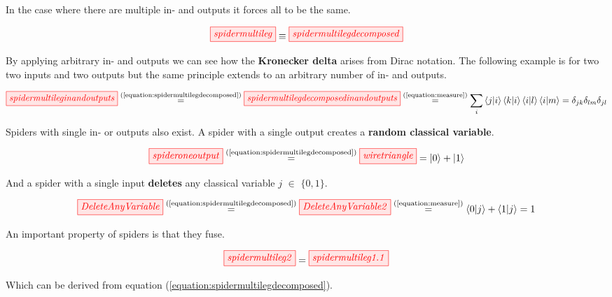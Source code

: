 \documentclass[]{article}
\newcommand{\equaltext}[1]{\ensuremath{\stackrel{\text{#1}}{=}}}
\begin{document}
In the case where there are multiple in- and outputs it forces all to be the same.

\begin{equation}
\label{equation:spidermultilegdecomposed}
\tikzfig{spidermultileg} \equiv \tikzfig{spidermultilegdecomposed}
\end{equation}

By applying arbitrary in- and outputs we can see how the \textbf{Kronecker delta} arises from Dirac notation. The following example is for two two inputs and two outputs but the same principle extends to an arbitrary number of in- and outputs.

\begin{equation}
\begin{split}
\tikzfig{spidermultileginandoutputs} \equaltext{(\ref{equation:spidermultilegdecomposed})} \tikzfig{spidermultilegdecomposedinandoutputs} \equaltext{(\ref{equation:measure})} \sum_{i} \bra{j}\ket{i}\bra{k}\ket{i}\bra{i}\ket{l}\bra{i}\ket{m} = \delta_{jk} \delta_{lm}  \delta_{jl}
\end{split}
\end{equation}

Spiders with single in- or outputs also exist. A spider with a single output creates a 
\textbf{random classical variable}.

\begin{equation}
\label{equation:spideroneoutput}
\tikzfig{spideroneoutput} \equaltext{(\ref{equation:spidermultilegdecomposed})} \tikzfig{wiretriangle} = \ket{0} + \ket{1}
\end{equation}

And a spider with a single input \textbf{deletes} any classical variable $j$ $\in$ $\{0,1\}$.

\begin{equation}
 \tikzfig{DeleteAnyVariable} \equaltext{(\ref{equation:spidermultilegdecomposed})} \tikzfig{DeleteAnyVariable2} \equaltext{(\ref{equation:measure})}  \bra{0}\ket{j} + \bra{1}\ket{j} = 1
\end{equation}

An important property of spiders is that they fuse.

\begin{equation}
\label{equation:spiderfusion}
	\tikzfig{spidermultileg2} = \tikzfig{spidermultileg1.1}
\end{equation}

Which can be derived from equation (\ref{equation:spidermultilegdecomposed}).
\end{document}
